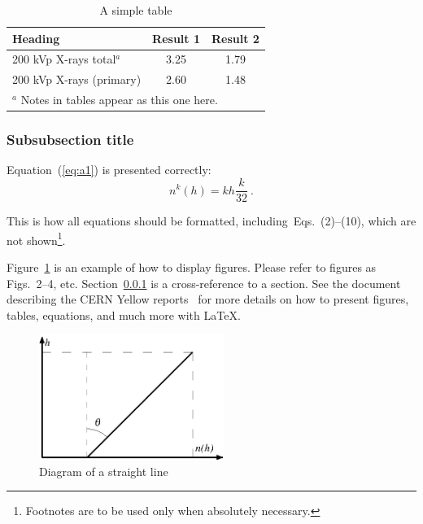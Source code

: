 \documentclass{cernrep}
\begin{document}
\begin{table}[h]
\begin{center}
\caption{A simple table}
\label{tab:LET}
\begin{tabular}{p{6cm}cc}
\hline\hline
\textbf{Heading}             & \textbf{Result 1}
                                                & \textbf{Result 2}\\
\hline
200 kVp X-rays total$^{a}$   & 3.25             & 1.79 \\
200 kVp X-rays (primary)     & 2.60             & 1.48 \\
\hline\hline
\multicolumn{3}{l}{$^{a}$ \footnotesize Notes in tables appear as
                      this one here.}
\end{tabular}
\end{center}
\end{table}

\subsubsection{Subsubsection title}
\label{sec:sss}

Equation~(\ref{eq:a1}) is presented correctly:
\begin{equation}
n^k(h)= k h \frac{k}{32}~. \label{eq:a1}  
\end{equation}

This is how all equations should be formatted,
including~Eqs.~(2)--(10), 
which are not shown\footnote{Footnotes are
to be used only when absolutely necessary.}.


Figure~\ref{tab:LET} is an example of how to display figures. Please
refer to figures as Figs.~2--4, etc.
Section~\ref{sec:sss} is a cross-reference to a section. 
See the document describing the CERN Yellow reports~\cite{cernrep} for more
details on how to present figures, tables, equations, and much more
with \LaTeX. 

\begin{figure}[ht]
\begin{center}
\includegraphics[width=6cm]{pictexa}
\caption{Diagram of a straight line}
\label{fig:line}
\end{center}
\end{figure}
\end{document}

